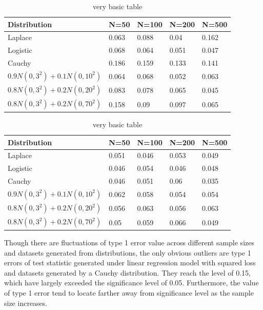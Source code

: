 \documentclass[12pt]{article}
\begin{document}
\begin{table}
\centering
\begin{tabular}{lllll}
\hline
Distribution & N=50 & N=100 & N=200 & N=500 \\
\hline
Laplace&  0.063& 0.088 &  0.04 & 0.162\\
Logistic &  0.068 & 0.064 &  0.051 & 0.047 \\
Cauchy &  0.186 & 0.159 &  0.133 & 0.141\\
$0.9 N(0, 3^2) + 0.1 N(0, 10^2)$ &  0.064 & 0.068  &  0.052 & 0.063\\
$0.8 N(0, 3^2) + 0.2 N(0, 20^2)$ &  0.083 & 0.078 &  0.065 & 0.045\\
$0.8 N(0, 3^2) + 0.2 N(0, 70^2)$ &  0.158 & 0.09  &  0.097 & 0.065\\
\hline
\end{tabular}
\caption{very basic table}
\label{tab:abc}
\end{table}

\begin{table}
\centering
\begin{tabular}{lllll}
\hline
Distribution & N=50 & N=100 & N=200 & N=500 \\
\hline
Laplace&  0.051& 0.046 &  0.053 & 0.049\\
Logistic &  0.046 & 0.054 &  0.046 & 0.048 \\
Cauchy &  0.046 & 0.051 &  0.06 & 0.035\\
$0.9 N(0, 3^2) + 0.1 N(0, 10^2)$ &  0.062 & 0.058  &  0.054 & 0.054\\
$0.8 N(0, 3^2) + 0.2 N(0, 20^2)$ &  0.056 & 0.063 &  0.056 & 0.063\\
$0.8 N(0, 3^2) + 0.2 N(0, 70^2)$ &  0.05 & 0.059  &  0.066 & 0.049\\
\hline
\end{tabular}
\caption{very basic table}
\label{tab:abc}
\end{table}

Though there are fluctuations of type 1 error value across different sample sizes and datasets generated from distributions, the only obvious outliers are type 1 errors of test statistic generated under linear regression model with squared loss and datasets generated by a Cauchy distribution. They reach the level of 0.15, which have largely exceeded the significance level of 0.05. Furthermore, the value of type 1 error tend to locate farther away from significance level as the sample size increases.
\end{document}
